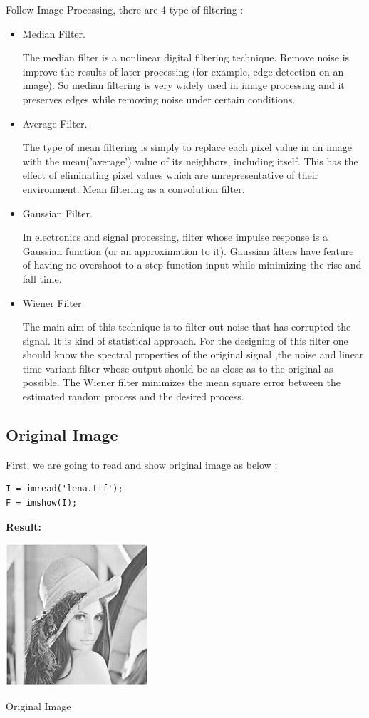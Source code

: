 \documentclass[10pt]{article}
\begin{document}
Follow Image Processing,  there are 4 type of filtering :
\begin{itemize}
	\item  Median Filter.

The median filter is a nonlinear digital filtering technique.  Remove noise is improve the results of later processing (for example, edge detection on an image). So median filtering is very widely used in image processing and it preserves edges while removing noise under certain conditions.

	\item  Average Filter.
	
	The type of mean filtering is simply to replace each pixel value in an image with the mean('average') value of its neighbors, including itself. This has the effect of eliminating pixel values which are
	unrepresentative of their environment. Mean filtering as a convolution filter.
	
	\item  Gaussian Filter.
	
	In electronics and signal processing, filter whose impulse response is a Gaussian function (or an approximation to it). Gaussian filters have feature of having no overshoot to a step function input while minimizing the rise and fall time.

	\item Wiener Filter
	
	The main aim of this technique is to filter out noise that has corrupted the signal. It is kind of statistical approach. For the designing of this filter one should know the spectral properties of the original signal ,the noise and linear time-variant filter whose output should be as close as to the original as possible. The Wiener filter minimizes the mean square error between the estimated random process and the desired process.
	



\end{itemize}

 \subsection{Original Image }
First, we are going to read and show original image as below :
\begin{lstlisting}
I = imread('lena.tif');
F = imshow(I);
\end{lstlisting}

\textbf{Result:}
\begin{center}
	\includegraphics{lena1.png}

 Original Image
\end{center}
\end{document}
